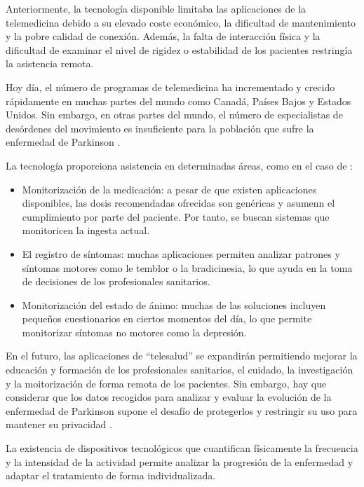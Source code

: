 Anteriormente, la tecnología disponible limitaba las aplicaciones de la telemedicina debido a su elevado coste económico, la dificultad de mantenimiento y la pobre calidad de conexión. Además, la falta de interacción física y la dificultad de examinar el nivel de rigidez o estabilidad de los pacientes restringía la asistencia remota.

Hoy día, el número de programas de telemedicina ha incrementado y crecido rápidamente en muchas partes del mundo como Canadá, Países Bajos y Estados Unidos. Sin embargo, en otras partes del mundo, el número de especialistas de desórdenes del movimiento es insuficiente para la población que sufre la enfermedad de Parkinson \cite{achey2014past}.

La tecnología proporciona asistencia en determinadas áreas, como en el caso de \cite{stamford2015engineering}:

\begin{itemize}
    \item Monitorización de la medicación: a pesar de que existen aplicaciones disponibles, las dosis recomendadas ofrecidas son genéricas y asumenn el cumplimiento por parte del paciente. Por tanto, se buscan sistemas que monitoricen la ingesta actual.
    \item El registro de síntomas: muchas aplicaciones permiten analizar patrones y síntomas motores como le temblor o la bradicinesia, lo que ayuda en la toma de decisiones de los profesionales sanitarios. 
    \item Monitorización del estado de ánimo: muchas de las soluciones incluyen pequeños cuestionarios en ciertos momentos del día, lo que permite monitorizar síntomas no motores como la depresión.
\end{itemize}

En el futuro, las aplicaciones de “telesalud” se expandirán permitiendo mejorar la educación y formación de los profesionales sanitarios, el cuidado, la investigación y la moitorización de forma remota de los pacientes. Sin embargo, hay que considerar que los datos recogidos para analizar y evaluar la evolución de la enfermedad de Parkinson supone el desafío de protegerlos y restringir su uso para mantener su privacidad \cite{achey2014past}.


La existencia de dispositivos tecnológicos que cuantifican físicamente la frecuencia y la intensidad de la actividad permite analizar la progresión de la enfermedad y adaptar el tratamiento de forma individualizada. 

